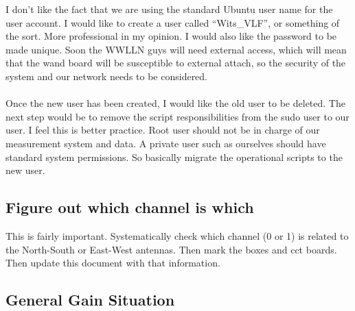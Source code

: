 \documentclass[a4paper,12pt]{article}
\begin{document}
I don't like the fact that we are using the standard Ubuntu user name for the user account. I would like to create a user called ``Wits\_VLF'', or something of the sort. More professional in my opinion. I would also like the password to be made unique. Soon the WWLLN guys will need external access, which will mean that the wand board will be susceptible to external attach, so the security of the system and our network needs to be considered.\\
\\
Once the new user has been created, I would like the old user to be deleted. The next step would be to remove the script responsibilities from the sudo user to our user. I feel this is better practice. Root user should not be in charge of our measurement system and data. A private user such as ourselves should have standard system permissions. So basically migrate the operational scripts to the new user.

\subsection{Figure out which channel is which}

This is fairly important. Systematically check which channel (0 or 1) is related to the North-South or East-West antennas. Then mark the boxes and cct boards. Then update this document with that information.

\subsection{General Gain Situation}
\end{document}
